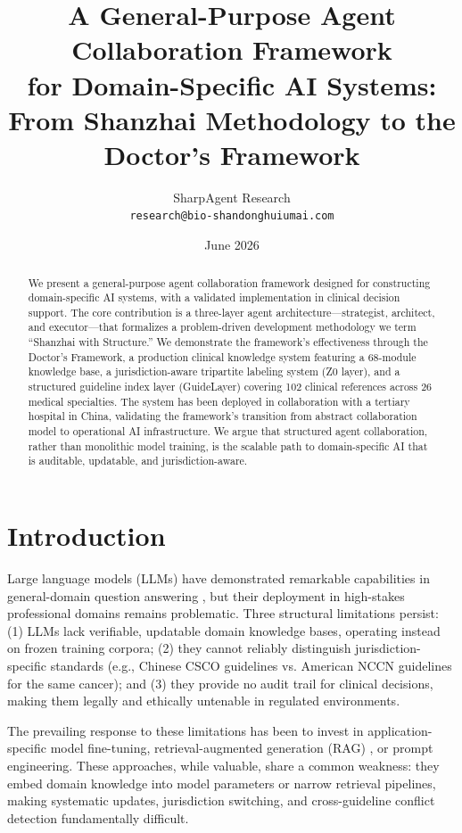\documentclass[11pt]{article}
\title{A General-Purpose Agent Collaboration Framework \\
for Domain-Specific AI Systems: \\
From Shanzhai Methodology to the Doctor's Framework}
\author{SharpAgent Research \\
\texttt{research@bio-shandonghuiumai.com}}
\date{June 2026}
\begin{document}
\maketitle

\begin{abstract}
We present a general-purpose agent collaboration framework designed for 
constructing domain-specific AI systems, with a validated implementation 
in clinical decision support. The core contribution is a three-layer 
agent architecture---strategist, architect, and executor---that formalizes 
a problem-driven development methodology we term ``Shanzhai with Structure.'' 
We demonstrate the framework's effectiveness through the Doctor's Framework, 
a production clinical knowledge system featuring a 68-module knowledge base, 
a jurisdiction-aware tripartite labeling system (Z0 layer), and a structured 
guideline index layer (GuideLayer) covering 102 clinical references across 
26 medical specialties. The system has been deployed in collaboration with 
a tertiary hospital in China, validating the framework's transition from 
abstract collaboration model to operational AI infrastructure. We argue 
that structured agent collaboration, rather than monolithic model training, 
is the scalable path to domain-specific AI that is auditable, updatable, 
and jurisdiction-aware.
\end{abstract}

\section{Introduction}

Large language models (LLMs) have demonstrated remarkable capabilities in 
general-domain question answering \cite{brown2020language}, but their deployment 
in high-stakes professional domains remains problematic. Three structural 
limitations persist: (1) LLMs lack verifiable, updatable domain knowledge 
bases, operating instead on frozen training corpora; (2) they cannot reliably 
distinguish jurisdiction-specific standards (e.g., Chinese CSCO guidelines 
vs. American NCCN guidelines for the same cancer); and (3) they provide no 
audit trail for clinical decisions, making them legally and ethically 
untenable in regulated environments.

The prevailing response to these limitations has been to invest in 
application-specific model fine-tuning, retrieval-augmented generation (RAG) 
\cite{lewis2020retrieval}, or prompt engineering. These approaches, while 
valuable, share a common weakness: they embed domain knowledge into model 
parameters or narrow retrieval pipelines, making systematic updates, 
jurisdiction switching, and cross-guideline conflict detection fundamentally 
difficult.
\end{document}
